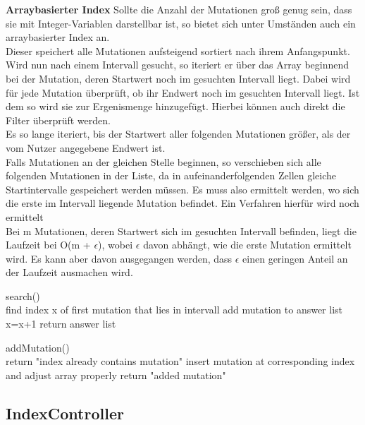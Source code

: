 \documentclass[]{article}
\begin{document}
\newpage
\textbf{Arraybasierter Index}
Sollte die Anzahl der Mutationen groß genug sein, dass sie mit Integer-Variablen darstellbar ist, so bietet sich unter Umständen auch ein arraybasierter Index an.\\
Dieser speichert alle Mutationen aufsteigend sortiert nach ihrem Anfangspunkt.
Wird nun nach einem Intervall gesucht, so iteriert er über das Array beginnend bei der Mutation, deren Startwert noch im gesuchten Intervall liegt. Dabei wird für jede Mutation überprüft, ob ihr Endwert noch im gesuchten Intervall liegt. Ist dem so wird sie zur Ergenismenge hinzugefügt. Hierbei können auch direkt die Filter überprüft werden.\\
Es so lange iteriert, bis der Startwert aller folgenden Mutationen größer, als der vom Nutzer angegebene Endwert ist.\\
Falls Mutationen an der gleichen Stelle beginnen, so verschieben sich alle folgenden Mutationen in der Liste, da in aufeinanderfolgenden Zellen gleiche Startintervalle gespeichert werden müssen. Es muss also ermittelt werden, wo sich die erste im Intervall liegende Mutation befindet. Ein Verfahren hierfür wird noch ermittelt\\
Bei m Mutationen, deren Startwert sich im gesuchten Intervall befinden, liegt die Laufzeit bei O(m + $\epsilon$), wobei $\epsilon$ davon abhängt, wie die erste Mutation ermittelt wird. Es kann aber davon ausgegangen werden, dass $\epsilon$ einen geringen Anteil an der Laufzeit ausmachen wird.
\begin{algorithm}
search()\\{
find index x of first mutation that lies in intervall\;
{{
{add mutation to answer list\;}
}
x=x+1\;
}
return answer list\;}

\end{algorithm}


\begin{algorithm}
addMutation()\\{
{return "index already contains mutation"\;}
insert mutation at corresponding index and adjust array properly\;
return "added mutation"\;}
\end{algorithm}
\newpage
\subsection{IndexController}
\end{document}
